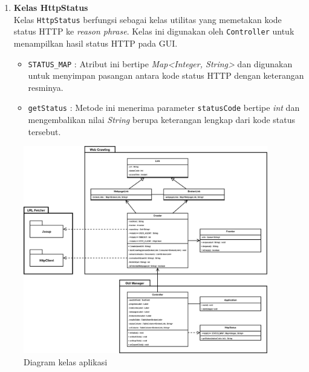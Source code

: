 \begin{enumerate}
    \item \textbf{Kelas HttpStatus}\\
    Kelas \texttt{HttpStatus} berfungsi sebagai kelas utilitas yang memetakan kode status HTTP ke \textit{reason phrase}. Kelas ini digunakan oleh \texttt{Controller} untuk menampilkan hasil status HTTP pada GUI.
    \begin{itemize}
        \item \texttt{STATUS\_MAP} : Atribut ini bertipe \textit{Map<Integer, String>} dan digunakan untuk menyimpan pasangan antara kode status HTTP dengan keterangan resminya.
        \item \texttt{getStatus} : Metode ini menerima parameter \texttt{statusCode} bertipe \textit{int} dan mengembalikan nilai \textit{String} berupa keterangan lengkap dari kode status tersebut.
    \end{itemize}
\end{enumerate}

\begin{figure}[H]
    \centering
    \includegraphics[width=0.95\textwidth]{Gambar/040100-class-diagram.png}
    \caption{Diagram kelas aplikasi}
    \label{fig:class-diagram}
\end{figure}